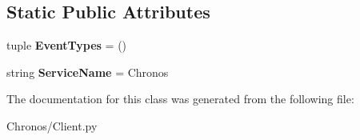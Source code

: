 \subsection*{Static Public Attributes}
\begin{DoxyCompactItemize}
\item 
tuple {\bfseries Event\+Types} = ()
\item 
string {\bfseries Service\+Name} = \textquotesingle{}Chronos\textquotesingle{}
\end{DoxyCompactItemize}


The documentation for this class was generated from the following file\+:\begin{DoxyCompactItemize}
\item 
Chronos/Client.\+py\end{DoxyCompactItemize}
